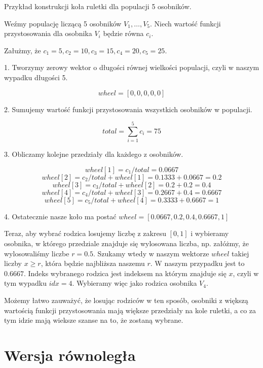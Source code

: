 \begin{example}
    Przykład konstrukcji koła ruletki dla populacji 5 osobników. 

    Weźmy populację liczącą 5 osobników $V_1, \dots, V_5$. Niech wartość funkcji przystosowania dla osobnika $V_i$ będzie równa $c_i$.

    Załużmy, że $c_1 = 5, c_2 = 10, c_3 = 15, c_4 = 20, c_5 = 25$.

    1. Tworzymy zerowy wektor o długości równej wielkości populacji, czyli w naszym wypadku długości 5.

    $$wheel = [0, 0, 0, 0, 0]$$

    2. Sumujemy wartość funkcji przystosowania wszystkich osobników w populacji.

    $$total = \sum_{i=1}^{5} c_i = 75$$

    3. Obliczamy kolejne przedziały dla każdego z osobników.

    $$wheel[1] = c_1 / total = 0.0667$$
    $$wheel[2] = c_2 / total + wheel[1] = 0.1333 + 0.0667 = 0.2$$
    $$wheel[3] = c_3 / total + wheel[2] = 0.2 + 0.2 = 0.4$$
    $$wheel[4] = c_4 / total + wheel[3] = 0.2667 + 0.4 = 0.6667$$
    $$wheel[5] = c_5 / total + wheel[4] = 0.3333 + 0.6667 = 1$$

    4. Ostatecznie nasze koło ma postać $wheel = [0.0667, 0.2, 0.4, 0.6667, 1]$

    Teraz, aby wybrać rodzica losujemy liczbę z zakresu $[0, 1]$ i wybieramy osobnika, w którego przedziale znajduje się wylosowana liczba, np.
    załóżmy, że wylosowaliśmy liczbe $r = 0.5$. Szukamy wtedy w naszym wektorze $wheel$ takiej liczby $x \ge r$, która będzie najbliższa 
    naszemu $r$. W naszym przypadku jest to $0.6667$. Indeks wybranego rodzica jest indeksem na którym znajduje się $x$, czyli w tym wypadku $idx = 4$.
    Wybieramy więc jako rodzica osobnika $V_4$.

    Możemy łatwo zauważyć, że losując rodziców w ten sposób, osobniki z większą wartością funkcji przystosowania mają większe przedziały na kole 
    ruletki, a co za tym idzie mają wieksze szanse na to, że zostaną wybrane.
    
\end{example}

\section{Wersja równoległa}

